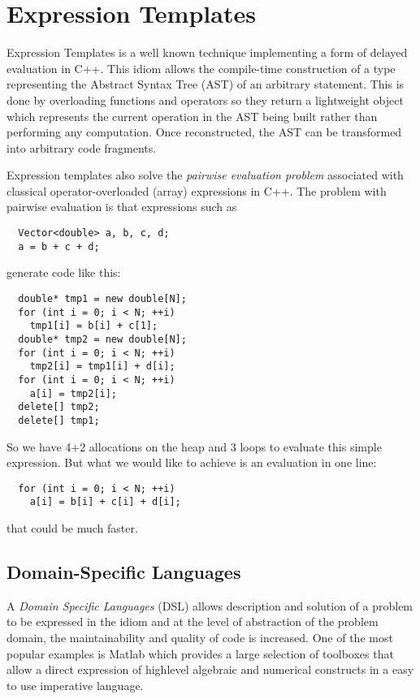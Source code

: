 \chapter{Expression Templates}
Expression Templates is a well known technique implementing a form of delayed evaluation in C++. This idiom allows the compile-time
construction of a type representing the Abstract Syntax Tree (AST) of an arbitrary statement. This is done by overloading functions and
operators so they return a lightweight object which represents the current operation in the AST being built rather than performing any
computation. Once reconstructed, the AST can be transformed into arbitrary code fragments.

Expression templates also solve the \textit{pairwise evaluation problem} associated with classical operator-overloaded (array) expressions
in C++. The problem with pairwise evaluation is that expressions such as
%
\begin{verbatim}
  Vector<double> a, b, c, d;
  a = b + c + d;
\end{verbatim}
%
generate code like this:
%
\begin{verbatim}
  double* tmp1 = new double[N];
  for (int i = 0; i < N; ++i)
    tmp1[i] = b[i] + c[1];
  double* tmp2 = new double[N];
  for (int i = 0; i < N; ++i)
    tmp2[i] = tmp1[i] + d[i];
  for (int i = 0; i < N; ++i)
    a[i] = tmp2[i];
  delete[] tmp2;
  delete[] tmp1;
\end{verbatim}

So we have 4+2 allocations on the heap and 3 loops to evaluate this simple expression. But what we would like to achieve is an evaluation
in one line:
%
\begin{verbatim}
  for (int i = 0; i < N; ++i)
    a[i] = b[i] + c[i] + d[i];
\end{verbatim}
%
that could be much faster.


\section{Domain-Specific Languages}
A \emph{Domain Specific Languages} (DSL) allows description and solution of a problem to be
expressed in the idiom and at the level of abstraction of the problem domain, the
maintainability and quality of code is increased. One of the most popular examples
is \textsf{Matlab} which provides a large selection of toolboxes that allow a direct
expression of highlevel algebraic and numerical constructs in a easy to use imperative
language.

